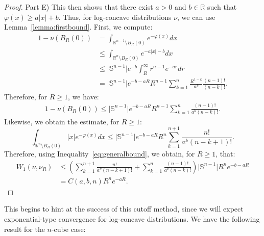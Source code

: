 \documentclass{amsart}
\theoremstyle{lemma}
\newtheorem{lemma}[theorem]{Lemma}
\theoremstyle{remark}
\begin{document}
\begin{proof}
Part E) This then shows that there exist $a>0$ and $b \in \mathbb{R}$ such that $\varphi(x) \geq a\left\vert x \right\vert + b$. Thus, for log-concave distributions $\nu$, we can use Lemma~\ref{lemma:firstbound}. First, we compute:
\begin{align}\label{eq:mbn1}
1 - \nu(B_{R}(0)) &= \int_{\mathbb{R}^{n-1} \setminus B_{R}(0)} e^{-\varphi(x)}dx \\
&\leq \int_{\mathbb{R}^{n} \setminus B_{R}(0)} e^{-a \vert x \vert - b}dx \\
&\leq \vert \mathbb{S}^{n-1} \vert e^{-b} \int_{R}^{\infty} r^{n-1}e^{-a r}dr \\
&= \vert \mathbb{S}^{n-1} \vert e^{-b-aR} R^{n-1} \sum_{k=1}^{n} \frac{R^{1-k}}{a^k} \frac{(n-1)!}{(n-k)!}.
\end{align}
Therefore, for $R \geq 1$, we have:
\begin{align}
1 - \nu(B_{R}(0)) \leq \vert \mathbb{S}^{n-1} \vert e^{-b-aR} R^{n-1} \sum_{k=1}^{n} \frac{(n-1)!}{a^k(n-k)!}.
\end{align}
Likewise, we obtain the estimate, for $R \geq 1$:
\begin{equation}\label{eq:mbn2}
\int_{\mathbb{R}^n \setminus B_{R}(0)} \vert x \vert e^{-\varphi(x)}dx \leq \vert \mathbb{S}^{n-1} \vert e^{-b - aR} R^n \sum_{k=1}^{n+1} \frac{n!}{a^k (n - k+1)!}.
\end{equation}
Therefore, using Inequality~\eqref{eq:generalbound}, we obtain, for $R \geq 1$, that:
\begin{align}\label{eq:fastrate}
W_1(\nu, \nu_R) &\leq \left( \sum_{k=1}^{n+1} \frac{n!}{a^k(n - k + 1)!} + \sum_{k=1}^{n} \frac{(n-1)!}{a^k(n - k)!} \right) \vert \mathbb{S}^{n-1} \vert R^n e^{-b - aR} \\
&= C(a, b, n) R^n e^{-aR}.
\end{align}
\end{proof}

This begins to hint at the success of this cutoff method, since we will expect exponential-type convergence for log-concave distributions. We have the following result for the $n$-cube case:

\end{document}

